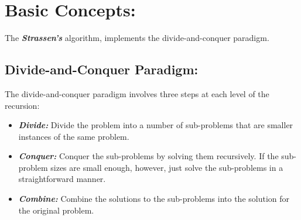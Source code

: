 \section{Basic Concepts:}

The {\bfseries\itshape Strassen's} algorithm, implements the divide-and-conquer paradigm.

\subsection{Divide-and-Conquer Paradigm:}

The divide-and-conquer paradigm involves three steps at each level of the recursion:

\begin{itemize}
\item {\bfseries\itshape Divide:} Divide the problem into a number of sub-problems that are smaller instances of the same problem.
\item {\bfseries\itshape Conquer:} Conquer the sub-problems by solving them recursively. If the sub-problem sizes are small enough, however, just solve the sub-problems in a straightforward manner.
\item {\bfseries\itshape Combine:} Combine the solutions to the sub-problems into the solution for the original problem.
\end{itemize}

\pagebreak